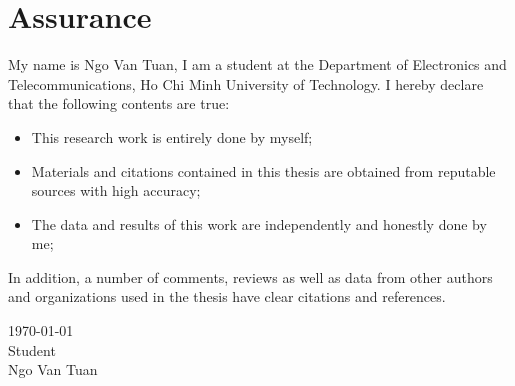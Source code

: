 \documentclass[\main/thesis.tex]{subfiles}
\begin{document}
\graphicspath{{imgs/}{00_misc/imgs/}}

\chapter*{Assurance}

My name is Ngo Van Tuan, I am a student at the Department of Electronics and Telecommunications, Ho Chi Minh University of Technology.
\newline\newline
I hereby declare that the following contents are true:
\begin{itemize}
    \item This research work is entirely done by myself;
    \item Materials and citations contained in this thesis are obtained from reputable sources with high accuracy;
    \item The data and results of this work are independently and honestly done by me;
\end{itemize}

In addition, a number of comments, reviews as well as data from other authors and organizations used in the thesis have clear citations and references.

\begin{flushright}
    \parbox[t][4cm]{8cm}
    {   \centering
        \today\\
        Student\\
        \vspace{2cm}
        Ngo Van Tuan
    }
\end{flushright}
\end{document}
